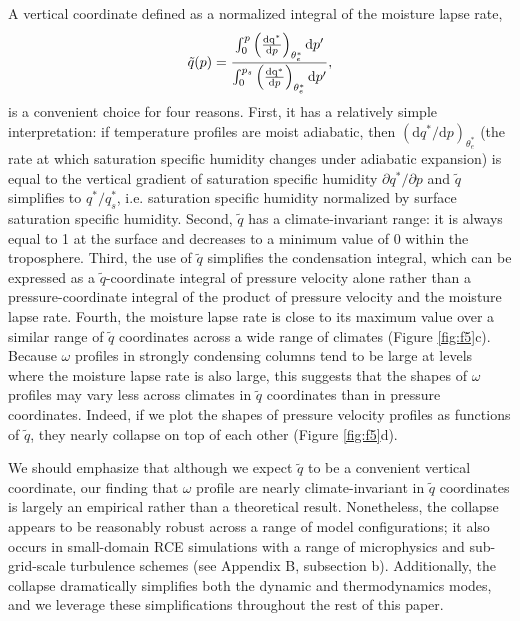 \documentclass[twocol]{ametsoc}
\begin{document}
A vertical coordinate defined as a normalized integral of the moisture lapse rate,
\begin{equation}
    \tilde{q}(p) = \frac{ \int_{0}^{p} \left (\frac{\rm{d}q^*}{{\rm d}p} \right)_{\theta_e^*} {\rm d}p' }{ \int_{0}^{p_s} \left (\frac{\rm{d}q^*}{{\rm d}p} \right)_{\theta_e^*} {\rm d}p'},
\end{equation}
is a convenient choice for four reasons. First, it has a relatively simple interpretation: if temperature profiles are moist adiabatic, then $\left(\mathrm{d}q^*/\mathrm{d}p \right)_{\theta_e^*}$ (the rate at which saturation specific humidity changes under adiabatic expansion) is equal to the vertical gradient of saturation specific humidity $\partial q^*/\partial p$ and $\tilde{q}$ simplifies to $q^*/q^*_s$, i.e. saturation specific humidity normalized by surface saturation specific humidity. Second, $\tilde{q}$ has a climate-invariant range: it is always equal to 1 at the surface and decreases to a minimum value of 0 within the troposphere. Third, the use of $\tilde{q}$ simplifies the condensation integral, which can be expressed as a $\tilde{q}$-coordinate integral of pressure velocity alone rather than a pressure-coordinate integral of the product of pressure velocity and the moisture lapse rate. Fourth, the moisture lapse rate is close to its maximum value over a similar range of $\tilde{q}$ coordinates across a wide range of climates (Figure \ref{fig:f5}c). Because $\omega$ profiles in strongly condensing columns tend to be large at levels where the moisture lapse rate is also large, this suggests that the shapes of $\omega$ profiles may vary less across climates in $\tilde{q}$ coordinates than in pressure coordinates. Indeed, if we plot the shapes of pressure velocity profiles as functions of $\tilde{q}$, they nearly collapse on top of each other (Figure \ref{fig:f5}d).

We should emphasize that although we expect $\tilde{q}$ to be a convenient vertical coordinate, our finding that $\omega$ profile are nearly climate-invariant in $\tilde{q}$ coordinates is largely an empirical rather than a theoretical result. Nonetheless, the collapse appears to be reasonably robust across a range of model configurations; it also occurs in small-domain RCE simulations with a range of microphysics and sub-grid-scale turbulence schemes (see Appendix B, subsection b).  Additionally, the collapse dramatically simplifies both the dynamic and thermodynamics modes, and we leverage these simplifications throughout the rest of this paper.
\end{document}
